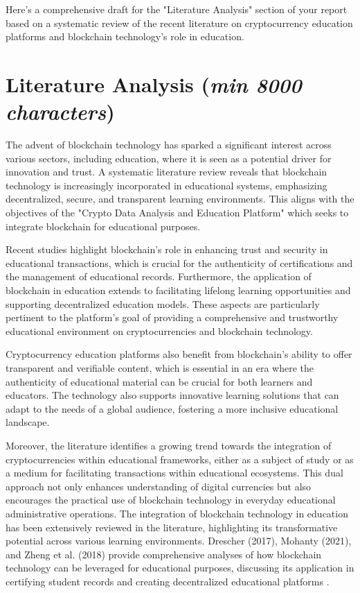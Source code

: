 \documentclass[12pt]{report}
\newcommand{\characters}[1]{(\textit{min #1 characters})}
\begin{document}
Here's a comprehensive draft for the "Literature Analysis" section of your report based on a systematic review of the recent literature on cryptocurrency education platforms and blockchain technology's role in education.

\section{Literature Analysis \characters{8000}}
The advent of blockchain technology has sparked a significant interest across various sectors, including education, where it is seen as a potential driver for innovation and trust. A systematic literature review reveals that blockchain technology is increasingly incorporated in educational systems, emphasizing decentralized, secure, and transparent learning environments. This aligns with the objectives of the "Crypto Data Analysis and Education Platform" which seeks to integrate blockchain for educational purposes.

Recent studies highlight blockchain's role in enhancing trust and security in educational transactions, which is crucial for the authenticity of certifications and the management of educational records. Furthermore, the application of blockchain in education extends to facilitating lifelong learning opportunities and supporting decentralized education models. These aspects are particularly pertinent to the platform's goal of providing a comprehensive and trustworthy educational environment on cryptocurrencies and blockchain technology.

Cryptocurrency education platforms also benefit from blockchain's ability to offer transparent and verifiable content, which is essential in an era where the authenticity of educational material can be crucial for both learners and educators. The technology also supports innovative learning solutions that can adapt to the needs of a global audience, fostering a more inclusive educational landscape.

Moreover, the literature identifies a growing trend towards the integration of cryptocurrencies within educational frameworks, either as a subject of study or as a medium for facilitating transactions within educational ecosystems. This dual approach not only enhances understanding of digital currencies but also encourages the practical use of blockchain technology in everyday educational administrative operations.
The integration of blockchain technology in education has been extensively reviewed in the literature, highlighting its transformative potential across various learning environments. Drescher (2017), Mohanty (2021), and Zheng et al. (2018) provide comprehensive analyses of how blockchain technology can be leveraged for educational purposes, discussing its application in certifying student records and creating decentralized educational platforms \cite{drescher2017, mohanty2021, zheng2018}.
\end{document}
